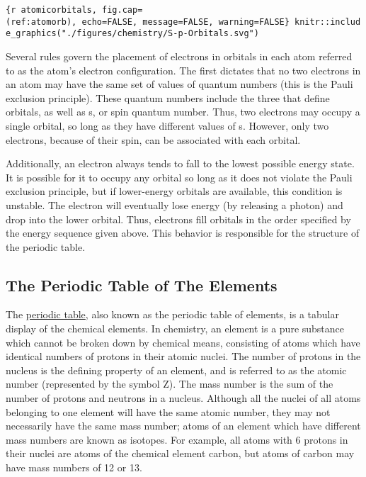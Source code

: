 \documentclass[
]{article}
\begin{document}
\texttt{\{r\ atomicorbitals,\ fig.cap=\textquotesingle{}(ref:atomorb)\textquotesingle{},\ echo=FALSE,\ message=FALSE,\ warning=FALSE\}\ knitr::include\_graphics("./figures/chemistry/S-p-Orbitals.svg")}

Several rules govern the placement of electrons in orbitals in each atom
referred to as the atom's electron configuration. The first dictates
that no two electrons in an atom may have the same set of values of
quantum numbers (this is the Pauli exclusion principle). These quantum
numbers include the three that define orbitals, as well as s, or spin
quantum number. Thus, two electrons may occupy a single orbital, so long
as they have different values of s. However, only two electrons, because
of their spin, can be associated with each orbital.

Additionally, an electron always tends to fall to the lowest possible
energy state. It is possible for it to occupy any orbital so long as it
does not violate the Pauli exclusion principle, but if lower-energy
orbitals are available, this condition is unstable. The electron will
eventually lose energy (by releasing a photon) and drop into the lower
orbital. Thus, electrons fill orbitals in the order specified by the
energy sequence given above. This behavior is responsible for the
structure of the periodic table.

\hypertarget{the-periodic-table-of-the-elements}{%
\subsection{The Periodic Table of The
Elements}\label{the-periodic-table-of-the-elements}}

The \href{https://en.wikipedia.org/wiki/Periodic_table}{periodic table},
also known as the periodic table of elements, is a tabular display of
the chemical elements. In chemistry, an element is a pure substance
which cannot be broken down by chemical means, consisting of atoms which
have identical numbers of protons in their atomic nuclei. The number of
protons in the nucleus is the defining property of an element, and is
referred to as the atomic number (represented by the symbol Z). The mass
number is the sum of the number of protons and neutrons in a nucleus.
Although all the nuclei of all atoms belonging to one element will have
the same atomic number, they may not necessarily have the same mass
number; atoms of an element which have different mass numbers are known
as isotopes. For example, all atoms with 6 protons in their nuclei are
atoms of the chemical element carbon, but atoms of carbon may have mass
numbers of 12 or 13.
\end{document}
